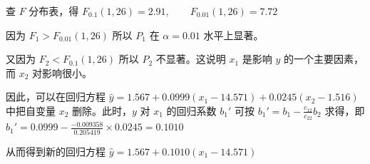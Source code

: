 \documentclass[UTF8,zihao=-4]{ctexart}
\begin{document}
查 $F$ 分布表，得 $F_{0.1}(1,26)=2.91, \qquad F_{0.01}(1,26)=7.72$

因为 $F_1>F_{0.01}(1,26)$ 所以 $P_1$ 在 $\alpha=0.01$ 水平上显著。

又因为 $F_2<F_{0.1}(1,26)$ 所以 $P_2$ 不显著。这说明 $x_1$ 是影响 $y$ 的一个主要因素，而 $x_2$ 对影响很小。

因此，可以在回归方程 $\hat{y}=1.567+0.0999(x_1-14.571)+0.0245(x_2-1.516)$ 中把自变量 $x_2$ 删除。此时，$y$ 对 $x_1$ 的回归系数 $b_1'$ 可按 $b_1' = b_1-\frac{c_{12}}{c_{22}}b_2$ 求得，即 $b_1' = 0.0999- \frac{-0.009358}{0.205419}\times0.0245 = 0.1010$

从而得到新的回归方程 $\hat{y} = 1.567+0.1010(x_1-14.571)$
\end{document}
